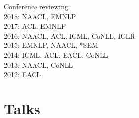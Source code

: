 \documentclass[margin,line]{res}
\begin{document}
\begin{resume}
\begin{hangparas}{.25in}{1}
Conference reviewing: \\
2018: NAACL, EMNLP\\
2017: ACL, EMNLP\\
2016: NAACL, ACL, ICML, CoNLL, ICLR\\
2015: EMNLP, NAACL, *SEM\\
2014: ICML, ACL, EACL, CoNLL \\
2013: NAACL, CoNLL \\
2012: EACL

\end{hangparas}

\section{\sc Talks}
\begin{hangparas}{.25in}{1}


\end{hangparas}
\end{resume}
\end{document}
